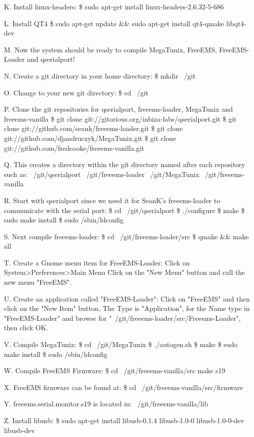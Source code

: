 \documentclass[12pt,notitlepage,onecolumn,oneside,draft]{memoir}
\begin{document}
K. Install linux-headers:
	\$ sudo apt-get install linux-headers-2.6.32-5-686

L. Install QT4
	\$ sudo apt-get update && sudo apt-get install qt4-qmake libqt4-dev

M. Now the system should be ready to compile MegaTunix, FreeEMS, FreeEMS-Loader and qserialport!

N. Create a git directory in your home directory:
	\$ mkdir ~/git

O. Change to your new git directory:
	\$ cd ~/git

P. Clone the git repositories for qserialport, freeems-loader, MegaTunix and freeems-vanilla
	\$ git clone git://gitorious.org/inbiza-labs/qserialport.git
	\$ git clone git://github.com/seank/freeems-loader.git
	\$ git clone git://github.com/djandruczyk/MegaTunix.git
	\$ git clone git://github.com/fredcooke/freeems-vanilla.git

Q. This creates a directory within the git directory named after each repository such as:
	~/git/qserialport	
	~/git/freeems-loader
	~/git/MegaTunix
	~/git/freeems-vanilla

R. Start with qserialport since we need it for SeanK's freeems-loader to communicate with the serial port:
	\$ cd ~/git/qserialport
	\$ ./configure
	\$ make
	\$ sudo make install
	\$ sudo /sbin/ldconfig

S. Next compile freeems-loader:
	\$ cd ~/git/freeems-loader/src
	\$ qmake && make all

T. Create a Gnome menu item for FreeEMS-Loader:
	Click on System>Preferences>Main Menu
	Click on the "New Menu" button and call the new menu "FreeEMS".

U. Create an application called "FreeEMS-Loader":
	Click on "FreeEMS" and then click on the "New Item" button,
	The Type is "Application", for the Name type in "FreeEMS-Loader" and browse for 
	"~/git/freeems-loader/src/Freeems-Loader", then click OK.

V. Compile MegaTunix:
	\$ cd ~/git/MegaTunix
	\$ ./autogen.sh
	\$ make
	\$ sudo make install
	\$ sudo /sbin/ldconfig

W. Compile FreeEMS Firmware:
	\$ cd ~/git/freeems-vanilla/src
	make s19

X. FreeEMS firmware can be found at:
	\$ cd ~/git/freeems-vanilla/src/firmware

Y. freeems.serial.monitor.s19 is located in:
	~/git/freeems-vanilla/lib

Z. Install libusb:
	\$ sudo apt-get install libusb-0.1.4 libusb-1.0-0 libusb-1.0-0-dev libusb-dev
\end{document}
